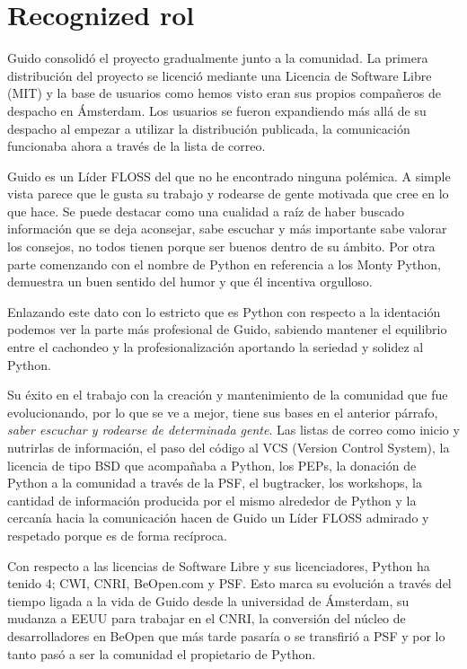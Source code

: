 \documentclass[11pt]{scrartcl}
\begin{document}
\section{Recognized rol}

Guido consolidó el proyecto gradualmente junto a la comunidad. La primera distribución del proyecto se licenció mediante una Licencia de Software Libre (MIT) y la base de usuarios como hemos visto eran sus propios compañeros de despacho en Ámsterdam. Los usuarios se fueron expandiendo más allá de su despacho al empezar a utilizar la distribución publicada, la comunicación funcionaba ahora a través de la lista de correo.

Guido es un Líder FLOSS del que no he encontrado ninguna polémica. A simple vista parece que le gusta su trabajo y rodearse de gente motivada que cree en lo que hace. Se puede destacar como una cualidad a raíz de haber buscado información que se deja aconsejar, sabe escuchar y más importante sabe valorar los consejos, no todos tienen porque ser buenos dentro de su ámbito. Por otra parte comenzando con el nombre de Python en referencia a los Monty Python, demuestra un buen sentido del humor y que él incentiva orgulloso.

Enlazando este dato con lo estricto que es Python con respecto a la identación podemos ver la parte más profesional de Guido, sabiendo mantener el equilibrio entre el cachondeo y la profesionalización aportando la seriedad y solidez al Python.

Su éxito en el trabajo con la creación y mantenimiento de la comunidad que fue evolucionando, por lo que se ve a mejor, tiene sus bases en el anterior párrafo, \emph{saber escuchar y rodearse de determinada gente}. Las listas de correo como inicio y nutrirlas de información, el paso del código al VCS (Version Control System), la licencia de tipo BSD que acompañaba a Python, los PEPs, la donación de Python a la comunidad a través de la PSF, el bugtracker, los workshops, la cantidad de información producida por el mismo alrededor de Python y la cercanía hacia la comunicación hacen de Guido un Líder FLOSS admirado y respetado porque es de forma recíproca.

Con respecto a las licencias de Software Libre y sus licenciadores, Python ha tenido 4; CWI, CNRI, BeOpen.com y PSF. Esto marca su evolución a través del tiempo ligada a la vida de Guido desde la universidad de Ámsterdam, su mudanza a EEUU para trabajar en el CNRI, la conversión del núcleo de desarrolladores en BeOpen que más tarde pasaría o se transfirió a PSF y por lo tanto pasó a ser la comunidad el propietario de Python.
\end{document}
